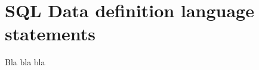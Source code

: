 %
%
%
%

\chapter{SQL Data definition language statements}

Bla bla bla

\begin{center}

\end{center}


